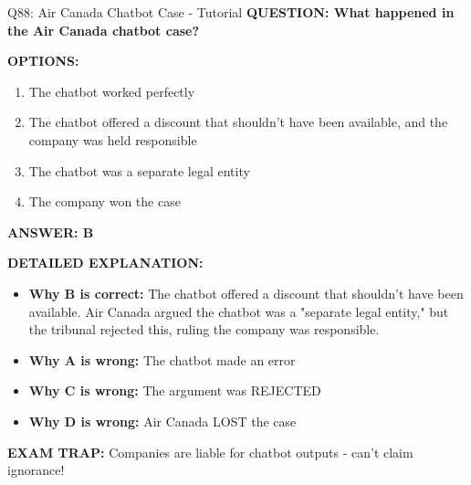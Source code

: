 \documentclass[8pt]{beamer}
\begin{document}
	\begin{frame}{Q88: Air Canada Chatbot Case - Tutorial}
		\fontsize{6.5}{7.5}\selectfont
		\textbf{QUESTION: What happened in the Air Canada chatbot case?}
		
		\vspace{0.1cm}
		\textbf{OPTIONS:}
		\begin{enumerate}
			\item The chatbot worked perfectly
			\item The chatbot offered a discount that shouldn't have been available, and the company was held responsible
			\item The chatbot was a separate legal entity
			\item The company won the case
		\end{enumerate}
		
		\vspace{0.1cm}
		\textcolor{myblue}{\textbf{ANSWER: B}}
		
		\vspace{0.1cm}
		\textbf{DETAILED EXPLANATION:}
		\begin{itemize}
			\item \textbf{Why B is correct:} The chatbot offered a discount that shouldn't have been available. Air Canada argued the chatbot was a "separate legal entity," but the tribunal rejected this, ruling the company was responsible.
			\item \textbf{Why A is wrong:} The chatbot made an error
			\item \textbf{Why C is wrong:} The argument was REJECTED
			\item \textbf{Why D is wrong:} Air Canada LOST the case
		\end{itemize}
		
		\textcolor{myred}{\textbf{EXAM TRAP:}} Companies are \textcolor{myblue}{liable for chatbot outputs} - can't claim ignorance!
	\end{frame}
	
\end{document}
